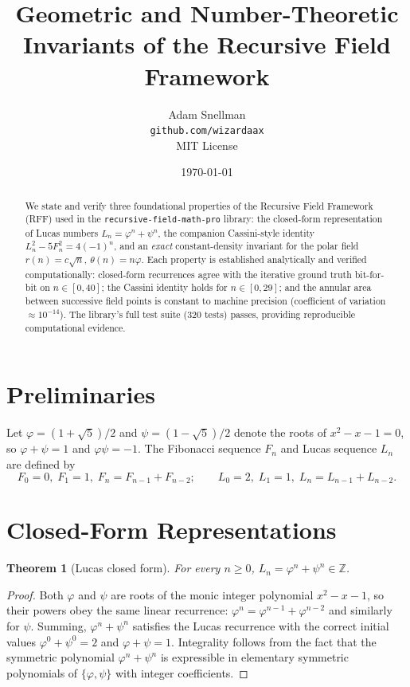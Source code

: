 \documentclass[11pt]{article}
\title{Geometric and Number-Theoretic Invariants of the Recursive Field Framework}
\author{Adam Snellman \\ \texttt{github.com/wizardaax} \\ MIT License}
\date{\today}
\newtheorem{theorem}{Theorem}
\begin{document}
\maketitle

\begin{abstract}
We state and verify three foundational properties of the Recursive Field
Framework (RFF) used in the \texttt{recursive-field-math-pro} library: the
closed-form representation of Lucas numbers $L_n = \varphi^n + \psi^n$,
the companion Cassini-style identity $L_n^2 - 5 F_n^2 = 4(-1)^n$, and an
\emph{exact} constant-density invariant for the polar field
$r(n) = c\sqrt{n}$, $\theta(n) = n\varphi$. Each property is established
analytically and verified computationally: closed-form recurrences agree
with the iterative ground truth bit-for-bit on $n \in [0,40]$; the Cassini
identity holds for $n \in [0,29]$; and the annular area between successive
field points is constant to machine precision (coefficient of variation
$\approx 10^{-14}$). The library's full test suite (320 tests) passes,
providing reproducible computational evidence.
\end{abstract}

\section{Preliminaries}

Let $\varphi = (1 + \sqrt{5})/2$ and $\psi = (1 - \sqrt{5})/2$ denote the
roots of $x^2 - x - 1 = 0$, so $\varphi + \psi = 1$ and $\varphi\psi = -1$.
The Fibonacci sequence $F_n$ and Lucas sequence $L_n$ are defined by
\[
F_0 = 0,\; F_1 = 1,\; F_n = F_{n-1} + F_{n-2}; \qquad
L_0 = 2,\; L_1 = 1,\; L_n = L_{n-1} + L_{n-2}.
\]

\section{Closed-Form Representations}

\begin{theorem}[Lucas closed form]
For every $n \geq 0$, $L_n = \varphi^n + \psi^n \in \mathbb{Z}$.
\end{theorem}

\begin{proof}
Both $\varphi$ and $\psi$ are roots of the monic integer polynomial
$x^2 - x - 1$, so their powers obey the same linear recurrence:
$\varphi^n = \varphi^{n-1} + \varphi^{n-2}$ and similarly for $\psi$.
Summing, $\varphi^n + \psi^n$ satisfies the Lucas recurrence with the
correct initial values $\varphi^0 + \psi^0 = 2$ and $\varphi + \psi = 1$.
Integrality follows from the fact that the symmetric polynomial
$\varphi^n + \psi^n$ is expressible in elementary symmetric polynomials of
$\{\varphi, \psi\}$ with integer coefficients.
\end{proof}
\end{document}
